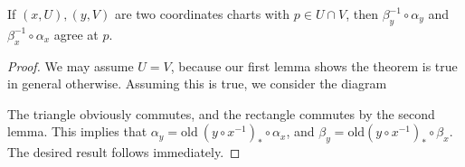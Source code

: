 \begin{lemma}
    If $(x,U), (y,V)$ are two coordinates charts with $p \in U \cap V$, then $\beta_y^{-1} \circ \alpha_y$ and $\beta_x^{-1} \circ \alpha_x$ agree at $p$.
\end{lemma}
\begin{proof}
    We may assume $U = V$, because our first lemma shows the theorem is true in general otherwise. Assuming this is true, we consider the diagram
    \begin{center}
    \end{center}
    The triangle obviously commutes, and the rectangle commutes by the second lemma. This implies that $\alpha_y = \text{old}\ (y \circ x^{-1})_* \circ \alpha_x$, and $\beta_y = \text{old}(y \circ x^{-1})_* \circ \beta_x$. The desired result follows immediately.
\end{proof}

